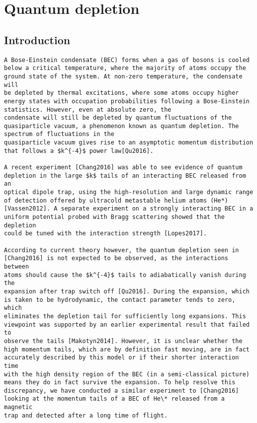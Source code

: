 \hypertarget{quantum-depletion}{%
\section{Quantum depletion}\label{quantum-depletion}}

\hypertarget{introduction}{%
\subsection{Introduction}\label{introduction}}

\begin{verbatim}
A Bose-Einstein condensate (BEC) forms when a gas of bosons is cooled
below a critical temperature, where the majority of atoms occupy the
ground state of the system. At non-zero temperature, the condensate will
be depleted by thermal excitations, where some atoms occupy higher
energy states with occupation probabilities following a Bose-Einstein
statistics. However, even at absolute zero, the
condensate will still be depleted by quantum fluctuations of the quasiparticle vacuum, a phenomenon known as quantum depletion. The spectrum of fluctuations in the
quasiparticle vacuum gives rise to an asymptotic momentum distribution
that follows a $k^{-4}$ power law[Qu2016].

A recent experiment [Chang2016] was able to see evidence of quantum
depletion in the large $k$ tails of an interacting BEC released from an
optical dipole trap, using the high-resolution and large dynamic range
of detection offered by ultracold metastable helium atoms (He*)
[Vassen2012]. A separate experiment on a strongly interacting BEC in a
uniform potential probed with Bragg scattering showed that the depletion
could be tuned with the interaction strength [Lopes2017].

According to current theory however, the quantum depletion seen in
[Chang2016] is not expected to be observed, as the interactions between
atoms should cause the $k^{-4}$ tails to adiabatically vanish during the
expansion after trap switch off [Qu2016]. During the expansion, which
is taken to be hydrodynamic, the contact parameter tends to zero, which
eliminates the depletion tail for sufficiently long expansions. This
viewpoint was supported by an earlier experimental result that failed to
observe the tails [Makotyn2014]. However, it is unclear whether the
high momentum tails, which are by definition fast moving, are in fact
accurately described by this model or if their shorter interaction time
with the high density region of the BEC (in a semi-classical picture)
means they do in fact survive the expansion. To help resolve this
discrepancy, we have conducted a similar experiment to [Chang2016]
looking at the momentum tails of a BEC of He\* released from a magnetic
trap and detected after a long time of flight.
\end{verbatim}

